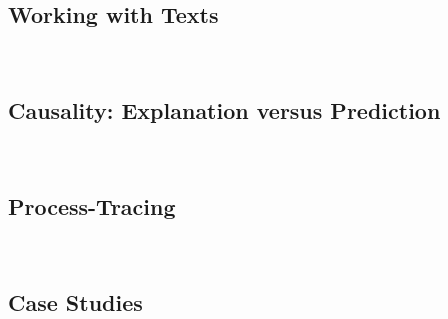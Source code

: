 \documentclass[12pt,a4paper]{article}
\newcommand{\lecture}[3][\DefaultOpt]{%
  \def\DefaultOpt{#2}%
  \clearpage\subsection[#1]{#2}\emph{#3}\vspace{.25em}\\
}
\begin{document}
\lecture{Working with Texts}{}

\lecture{Causality: Explanation versus Prediction}{}


\lecture{Process-Tracing}{}


\lecture{Case Studies}{}
\end{document}
